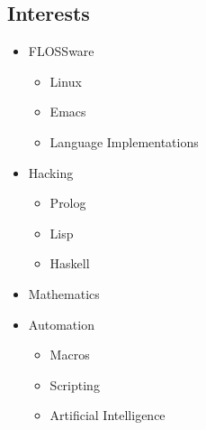 \documentclass[12pt,a4paper,oneside]{article}
\newcommand{\sh}[1]{{\color{gray}{#1}}}
\begin{document}
\subsection{Interests}
\begin{itemize}
	\setlength\itemsep{0em}
	\item FLOSSware
		\begin{itemize}
			\item Linux
			\item Emacs
			\item Language Implementations
		\end{itemize}
	\item Hacking%
		\begin{itemize}
			\item Prolog
			\item Lisp
			\item Haskell
		\end{itemize}
	\item Mathematics
	\item Automation
		\begin{itemize}
			\item Macros
			\item Scripting
			\item Artificial Intelligence
		\end{itemize}

\end{itemize}
\end{document}
